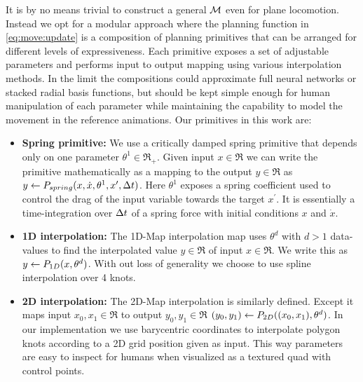It is by no means trivial to construct a general $\mathcal{M}$ even for plane locomotion. Instead we opt for a modular approach where the planning function in \eqref{eq:move:update} is a composition of planning primitives that can be arranged for different levels of expressiveness. Each primitive exposes a set of adjustable parameters and performs input to output mapping using various interpolation methods. In the limit the compositions could approximate full neural networks or stacked radial basis functions, but should be kept simple enough for human manipulation of each parameter while maintaining the capability to model the movement in the reference animations.     
%
Our primitives in this work are:

\begin{itemize}
\item{\bf Spring primitive:} We use a critically damped spring primitive that depends only on one parameter $\theta^1 \in \Re_+$. Given input $x \in \Re$ we can write the primitive mathematically as a mapping to the output $y \in \Re$ as $y \leftarrow P_{spring}{( x , \dot{x}, \theta^1, x^\prime, \Delta{t})}$. Here $\theta^1$ exposes a spring coefficient used to control the drag of the input variable towards the target $x^\prime$. It is essentially a time-integration over $\Delta{t}$ of a spring force with initial conditions $x$ and $\dot{x}$.

\item{\bf 1D interpolation:} The 1D-Map interpolation map uses $\theta^d$ with $d>1$ data-values to find the interpolated value $y \in \Re$ of input $x \in \Re$. We write this as  $y \leftarrow P_{1D}(x,\theta^{d})$. With out loss of generality we choose to use spline interpolation over 4 knots.

\item{\bf 2D interpolation:} The 2D-Map interpolation is similarly defined. Except it maps input $x_0,x_1 \in \Re$ to output $y_0,y_1 \in \Re$ $(y_0,y_1) \leftarrow P_{2D}( (x_0, x_1),\theta^{d})$. In our implementation we use barycentric coordinates to interpolate polygon knots according to a 2D grid position given as input. This way parameters are easy to inspect for humans when visualized as a textured quad with control points.   
\end{itemize}

